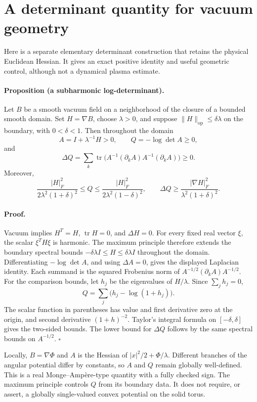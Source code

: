 \section{A determinant quantity for vacuum geometry}

Here is a separate elementary determinant construction that retains the physical Euclidean Hessian. It gives an exact positive identity and useful geometric control, although not a dynamical plasma estimate.

\paragraph{Proposition (a subharmonic log-determinant).}
Let $B$ be a smooth vacuum field on a neighborhood of the closure of a bounded smooth domain. Set $H=\nabla B$, choose $\lambda>0$, and suppose $\|H\|_{\mathrm{op}}\le\delta\lambda$ on the boundary, with $0<\delta<1$. Then throughout the domain
\[
A=I+\lambda^{-1}H>0,\qquad
Q=-\log\det A\ge0,
\]
and
\[
\Delta Q=\sum_k\operatorname{tr}
\big(A^{-1}(\partial_k A)A^{-1}(\partial_k A)\big)\ge0.
\]
Moreover,
\[
\frac{|H|_F^2}{2\lambda^2(1+\delta)^2}
\le Q\le
\frac{|H|_F^2}{2\lambda^2(1-\delta)^2},
\qquad
\Delta Q\ge\frac{|\nabla H|_F^2}{\lambda^2(1+\delta)^2}.
\]

\paragraph{Proof.}
Vacuum implies $H^T=H$, $\operatorname{tr}H=0$, and $\Delta H=0$. For every fixed real vector $\xi$, the scalar $\xi^TH\xi$ is harmonic. The maximum principle therefore extends the boundary spectral bounds $-\delta\lambda I\le H\le\delta\lambda I$ throughout the domain. Differentiating $-\log\det A$, and using $\Delta A=0$, gives the displayed Laplacian identity. Each summand is the squared Frobenius norm of $A^{-1/2}(\partial_kA)A^{-1/2}$. For the comparison bounds, let $h_j$ be the eigenvalues of $H/\lambda$. Since $\sum_jh_j=0$,
\[
Q=\sum_j\big(h_j-\log(1+h_j)\big).
\]
The scalar function in parentheses has value and first derivative zero at the origin, and second derivative $(1+h)^{-2}$. Taylor's integral formula on $[-\delta,\delta]$ gives the two-sided bounds. The lower bound for $\Delta Q$ follows by the same spectral bounds on $A^{-1/2}$. $\square$

Locally, $B=\nabla\Phi$ and $A$ is the Hessian of $|x|^2/2+\Phi/\lambda$. Different branches of the angular potential differ by constants, so $A$ and $Q$ remain globally well-defined. This is a real Monge--Ampère-type quantity with a fully checked sign. The maximum principle controls $Q$ from its boundary data. It does not require, or assert, a globally single-valued convex potential on the solid torus.

